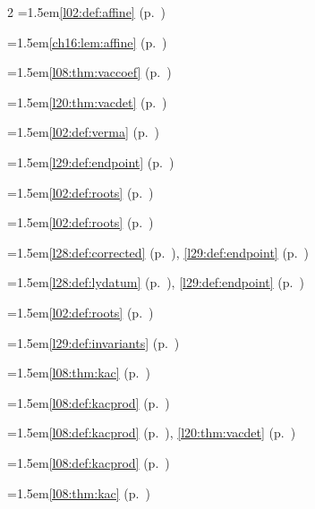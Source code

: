 \begin{multicols}{2}
\hangindent=1.5em\quad \ref{l02:def:affine} (p.~\pageref{l02:def:affine})\par
\hangindent=1.5em\quad \ref{ch16:lem:affine} (p.~\pageref{ch16:lem:affine})\par
\hangindent=1.5em\quad \ref{l08:thm:vaccoef} (p.~\pageref{l08:thm:vaccoef})\par
\hangindent=1.5em\quad \ref{l20:thm:vacdet} (p.~\pageref{l20:thm:vacdet})\par
\hangindent=1.5em\quad \ref{l02:def:verma} (p.~\pageref{l02:def:verma})\par
\hangindent=1.5em\quad \ref{l29:def:endpoint} (p.~\pageref{l29:def:endpoint})\par
\hangindent=1.5em\quad \ref{l02:def:roots} (p.~\pageref{l02:def:roots})\par
\hangindent=1.5em\quad \ref{l02:def:roots} (p.~\pageref{l02:def:roots})\par
\hangindent=1.5em\quad \ref{l28:def:corrected} (p.~\pageref{l28:def:corrected}), \ref{l29:def:endpoint} (p.~\pageref{l29:def:endpoint})\par
\hangindent=1.5em\quad \ref{l28:def:lydatum} (p.~\pageref{l28:def:lydatum}), \ref{l29:def:endpoint} (p.~\pageref{l29:def:endpoint})\par
\hangindent=1.5em\quad \ref{l02:def:roots} (p.~\pageref{l02:def:roots})\par
\hangindent=1.5em\quad \ref{l29:def:invariants} (p.~\pageref{l29:def:invariants})\par
\hangindent=1.5em\quad \ref{l08:thm:kac} (p.~\pageref{l08:thm:kac})\par
\hangindent=1.5em\quad \ref{l08:def:kacprod} (p.~\pageref{l08:def:kacprod})\par
\hangindent=1.5em\quad \ref{l08:def:kacprod} (p.~\pageref{l08:def:kacprod}), \ref{l20:thm:vacdet} (p.~\pageref{l20:thm:vacdet})\par
\hangindent=1.5em\quad \ref{l08:def:kacprod} (p.~\pageref{l08:def:kacprod})\par
\hangindent=1.5em\quad \ref{l08:thm:kac} (p.~\pageref{l08:thm:kac})\par

\end{multicols}
